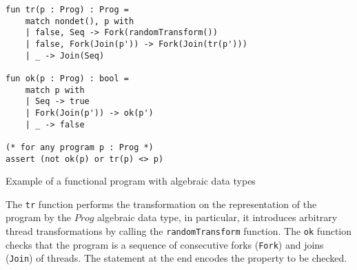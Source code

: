 \begin{example}[$ForkJoin$]
\begin{mylisting}
\begin{verbatim}
fun tr(p : Prog) : Prog =
    match nondet(), p with
    | false, Seq -> Fork(randomTransform())
    | false, Fork(Join(p')) -> Fork(Join(tr(p')))
    | _ -> Join(Seq)

fun ok(p : Prog) : bool =
    match p with
    | Seq -> true
    | Fork(Join(p')) -> ok(p')
    | _ -> false

(* for any program p : Prog *)
assert (not ok(p) or tr(p) <> p)
\end{verbatim}
\caption{Example of a functional program with algebraic data types}
\label{fig:ex-fork-join}
\end{mylisting}

The \texttt{tr} function performs the transformation on the representation of the program by the $Prog$ algebraic data type, in particular, it introduces arbitrary thread transformations by calling the \texttt{randomTransform} function. The \texttt{ok} function checks that the program is a sequence of consecutive forks (\texttt{Fork}) and joins (\texttt{Join}) of threads. The statement at the end encodes the property to be checked.


\end{example}
